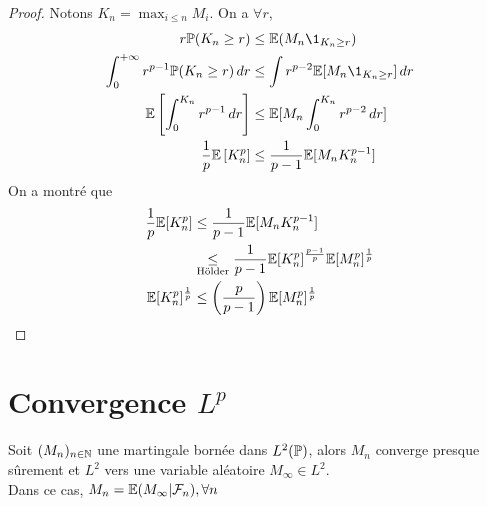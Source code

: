 \documentclass[]{report}
\begin{document}
    \begin{proof}
        Notons $K_n=\max_{i\le n}M_i$. On a $\forall r$,
        \begin{align*}
            r\Pa(K_n\ge r)&\le \Ea(M_n\1_{K_n\ge r})\\
            \int_{0}^{+\infty}r^{p-1}\Pa(K_n\ge r)\, dr&\le \int r^{p-2}\Ea[M_n\1_{K_n\ge r}]\, dr\\
            \Ea\left[ \int_{0}^{K_n} r^{p-1}\, dr\right]&\le \Ea[M_n\int_{0}^{K_n}r^{p-2}\, dr]\\
            \frac{1}{p}\Ea\left[ K_n^p\right] &\le\frac{1}{p-1}\Ea[M_n K_n^{p-1}]
        \end{align*}
        On a montré que
        \begin{align*}
            \frac{1}{p}\mathbb{E}[K_n^p]&\le \frac{1}{p-1}\mathbb{E}[M_n K_n^{p-1}]\\
            &\underset{\text{Hölder}}{\le}\frac{1}{p-1}\mathbb{E}[K_n^p]^{\frac{p-1}{p}}\mathbb{E}[M_n^p]^{\frac{1}{p}}\\
            \mathbb{E}[K_n^p]^{\frac{1}{p}}&\le\left(\frac{p}{p-1}\right)\mathbb{E}[M_n^p]^{\frac{1}{p}}
        \end{align*}
    \end{proof}

    \section{Convergence $L^p$}

    \begin{tm}{}{}
        Soit $(M_n)_{n\in\mathbb{N}}$ une martingale bornée dans $L^2(\mathbb{P})$, alors $M_n$ converge presque sûrement et $L^2$ vers une variable aléatoire $M_\infty\in L^2$.\\
        Dans ce cas, $M_n=\mathbb{E}(M_\infty |\mathcal{F}_n),\forall n$
    \end{tm}
\end{document}
